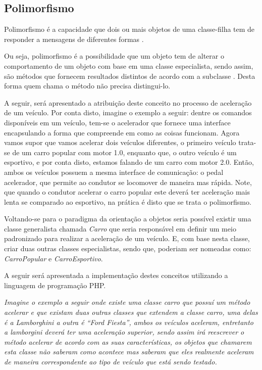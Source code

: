 \subsection{Polimorfismo}

Polimorfismo é a capacidade que dois ou mais objetos de uma classe-filha tem  de
responder a mensagens de diferentes formas
\cite{php5ConceitosProgramacaoEIntegracaoComBancoDeDados}.

Ou seja, polimorfismo é a possibilidade que um objeto tem de alterar o
comportamento de um objeto com base em uma classe especialista, sendo assim,
são métodos que fornecem resultados distintos  de acordo com a subclasse
\cite{php5ConceitosProgramacaoEIntegracaoComBancoDeDados}. Desta forma quem
chama o método não precisa distingui-lo.

A seguir, será apresentado a atribuição deste conceito no processo de aceleração
de um veículo. Por conta disto, imagine o exemplo a seguir: dentre os comandos
disponíveis em um veículo, tem-se o acelerador que fornece uma interface
encapsulando a forma que compreende em como as coisas funcionam. Agora vamos
supor que vamos acelerar dois veículos diferentes, o primeiro veículo trata-se
de um carro popular com motor 1.0, enquanto que, o outro veículo é um
 esportivo, e por conta disto, estamos falando de um carro com motor 2.0. Então,
ambos os veículos possuem a mesma interface de comunicação: o pedal acelerador,
que permite ao condutor se locomover de maneira mas rápida. Note, que quando o
condutor acelerar o carro popular este deverá ter aceleração mais lenta se
comparado ao esportivo, na prática é disto que se trata o polimorfismo.

Voltando-se para o paradigma da orientação a objetos seria possível existir uma
classe generalista chamada \textit{Carro} que seria responsável em definir um
meio padronizado para realizar a aceleração de um veículo. E, com base nesta
classe, criar duas outras classes especialistas, sendo que, poderiam ser
nomeadas como: \textit{CarroPopular} e \textit{CarroEsportivo}.

A seguir será apresentada a implementação destes conceitos
utilizando a linguagem de programação PHP.

\textit{Imagine o exemplo a seguir onde existe uma classe carro que possuí um
método acelerar e que existam duas outras classes que extendem a classe carro, uma
delas é a Lamborghini a outra é “Ford Fiesta”, ambos os veículos
aceleram, entretanto a lamborgini deverá ter uma aceleração superior, sendo assim irá
reescrever o método acelerar de acordo com as suas características, os objetos
que chamarem esta classe não saberam como acontece mas saberam que eles
realmente  aceleram de maneira correspondente ao tipo de veículo que está sendo
testado.}